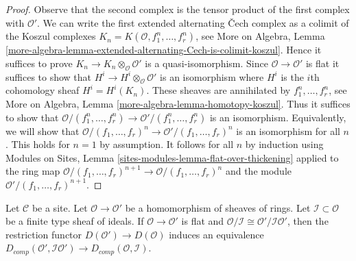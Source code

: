 \begin{proof}
Observe that the second complex is the tensor product of the first
complex with $\mathcal{O}'$. We can write the first extended
alternating {\v C}ech complex as a colimit of the Koszul complexes
$K_n = K(\mathcal{O}, f_1^n, \ldots, f_r^n)$, see
More on Algebra, Lemma
\ref{more-algebra-lemma-extended-alternating-Cech-is-colimit-koszul}.
Hence it suffices to prove $K_n \to K_n \otimes_\mathcal{O} \mathcal{O}'$
is a quasi-isomorphism. Since $\mathcal{O} \to \mathcal{O}'$ is flat
it suffices to show that $H^i \to H^i \otimes_\mathcal{O} \mathcal{O}'$
is an isomorphism where $H^i$ is the $i$th cohomology sheaf
$H^i = H^i(K_n)$. These sheaves are annihilated by $f_1^n, \ldots, f_r^n$, see
More on Algebra, Lemma \ref{more-algebra-lemma-homotopy-koszul}.
Thus it suffices to show that
$\mathcal{O}/(f_1^n, \ldots, f_r^n) \to \mathcal{O}'/(f_1^n, \ldots, f_r^n)$
is an isomorphism. Equivalently, we will show that
$\mathcal{O}/(f_1, \ldots, f_r)^n \to \mathcal{O}'/(f_1, \ldots, f_r)^n$
is an isomorphism for all $n$. This holds for $n = 1$ by assumption.
It follows for all $n$ by induction using
Modules on Sites, Lemma \ref{sites-modules-lemma-flat-over-thickening}
applied to the ring map
$\mathcal{O}/(f_1, \ldots, f_r)^{n + 1} \to \mathcal{O}/(f_1, \ldots, f_r)^n$
and the module $\mathcal{O}'/(f_1, \ldots, f_r)^{n + 1}$.
\end{proof}

\begin{lemma}
\label{lemma-restriction-derived-complete-equivalence}
Let $\mathcal{C}$ be a site. Let $\mathcal{O} \to \mathcal{O}'$ be a
homomorphism of sheaves of rings. Let $\mathcal{I} \subset \mathcal{O}$
be a finite type sheaf of ideals.
If $\mathcal{O} \to \mathcal{O}'$ is flat and
$\mathcal{O}/\mathcal{I} \cong \mathcal{O}'/\mathcal{I}\mathcal{O}'$,
then the restriction functor $D(\mathcal{O}') \to D(\mathcal{O})$
induces an equivalence
$D_{comp}(\mathcal{O}', \mathcal{I}\mathcal{O}') \to
D_{comp}(\mathcal{O}, \mathcal{I})$.
\end{lemma}

